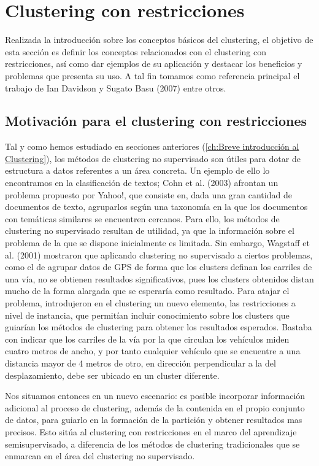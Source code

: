 \chapter{Clustering con restricciones}\label{ch:Clustering con restricciones}

Realizada la introducción sobre los conceptos básicos del clustering, el objetivo de esta sección es definir los conceptos relacionados con el clustering con restricciones, así como dar ejemplos de su aplicación y destacar los beneficios y problemas que presenta su uso. A tal fin tomamos como referencia principal el trabajo de Ian Davidson y Sugato Basu (2007) \cite{Survey:2007} entre otros.

\section{Motivación para el clustering con restricciones}

Tal y como hemos estudiado en secciones anteriores (\ref{ch:Breve introducción al Clustering}), los métodos de clustering no supervisado son útiles para dotar de estructura a datos referentes a un área concreta. Un ejemplo de ello lo encontramos en la clasificación de textos; Cohn et al. (2003) \cite{Cohn:2003} afrontan un problema propuesto por Yahoo!, que consiste en, dada una gran cantidad de documentos de texto, agruparlos según una taxonomía en la que los documentos con temáticas similares se encuentren cercanos. Para ello, los métodos de clustering no supervisado resultan de utilidad, ya que la información sobre el problema de la que se dispone inicialmente es limitada. Sin embargo, Wagstaff et al. (2001) mostraron que aplicando clustering no supervisado a ciertos problemas, como el de agrupar datos de GPS de forma que los clusters definan los carriles de una vía, no se obtienen resultados significativos, pues los clusters obtenidos distan mucho de la forma alargada que se esperaría como resultado. Para atajar el problema, introdujeron en el clustering un nuevo elemento, las restricciones a nivel de instancia, que permitían incluir conocimiento sobre los clusters que guiarían los métodos de clustering para obtener los resultados esperados. Bastaba con indicar que los carriles de la vía por la que circulan los vehículos miden cuatro metros de ancho, y por tanto cualquier vehículo que se encuentre a una distancia mayor de 4 metros de otro, en dirección perpendicular a la del desplazamiento, debe ser ubicado en un cluster diferente.

Nos situamos entonces en un nuevo escenario: es posible incorporar información adicional al proceso de clustering, además de la contenida en el propio conjunto de datos, para guiarlo en la formación de la partición y obtener resultados mas precisos. Esto sitúa al clustering con restricciones en el marco del aprendizaje semisupervisado, a diferencia de los métodos de clustering tradicionales que se enmarcan en el área del clustering no supervisado. 

